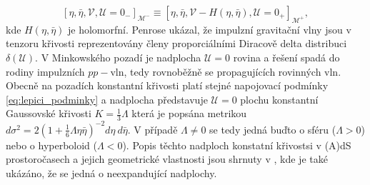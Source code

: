 \begin{equation}
    \label{eq:lepici_podminky}
\left[\eta, \bar{\eta}, \mathcal{V}, \mathcal{U}=0_- \right]_{\mathcal{M}^-} \equiv 
\left[\eta, \bar{\eta}, \mathcal{V}-H\left(\eta, \bar{\eta}\right), \mathcal{U}=0_+  \right]_{\mathcal{M}^+},
\end{equation}
kde $H(\eta, \bar{\eta})$ je holomorfní. Penrose \cite{Penrose:1972xrn} ukázal, že impulzní gravitační vlny
jsou v tenzoru křivosti reprezentovány členy proporciálními Diracově delta distribuci $\delta(\mathcal{U})$.
V Minkowského pozadí je nadplocha $\mathcal{U}=0$ rovina a řešení spadá do rodiny impulzních $pp-$vln, tedy
rovnoběžně se propagujících rovinných vln. Obecně na pozadích konstantní křivosti platí stejné napojovací podmínky
\eqref{eq:lepici_podminky} a nadplocha představuje $\mathcal{U}=0$ plochu konstantní Gaussovské křivosti 
$K=\frac{1}{3}\Lambda$ která je popsána metrikou $d\sigma^2=2(1+\frac{1}{6}\Lambda \eta \bar{\eta})^{-2} 
d\eta~d\bar{\eta}$. V případě $\Lambda \neq 0$ se tedy jedná buďto o sféru
($\Lambda > 0$) nebo o hyperboloid ($\Lambda < 0$). Popis těchto nadploch konstatní křivostsi v (A)dS prostoročasech a
jejich geometrické vlastnosti jsou shrnuty v \cite{Podolsky:1997ri}, kde je také ukázáno,
že se jedná o neexpandující nadplochy.


